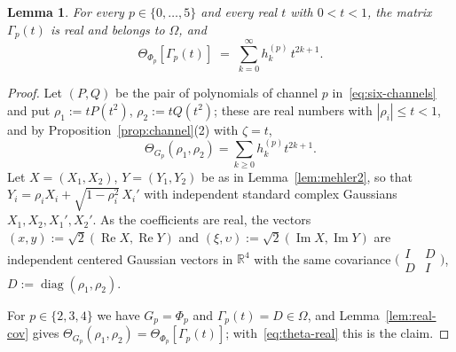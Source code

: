 \documentclass[11pt,reqno]{amsart}
\newtheorem{lemma}[theorem]{Lemma}
\theoremstyle{definition}
\numberwithin{equation}{section}
\newcommand{\R}{\mathbb{R}}
\newcommand{\Om}{\Omega}
\DeclareMathOperator{\RePart}{Re}
\DeclareMathOperator{\ImPart}{Im}
\DeclareMathOperator{\diag}{diag}
\begin{document}
\begin{lemma}\label{lem:six-corr}
For every $p\in\{0,\dots,5\}$ and every real $t$ with $0<t<1$, the matrix $\Gamma_p(t)$ is real and belongs to $\Om$, and
\[
  \Theta_{\Phi_p}[\Gamma_p(t)]\;=\;\sum_{k=0}^\infty h^{(p)}_k\,t^{2k+1}.
\]
\end{lemma}

\begin{proof}
Let $(P,Q)$ be the pair of polynomials of channel $p$ in~\eqref{eq:six-channels} and put $\rho_1:=tP(t^2)$, $\rho_2:=tQ(t^2)$; these are real numbers with $|\rho_i|\le t<1$, and by Proposition~\ref{prop:channel}(2) with $\zeta=t$,
\begin{equation}\label{eq:theta-real}
  \Theta_{G_p}(\rho_1,\rho_2)=\sum_{k\ge0}h^{(p)}_kt^{2k+1}.
\end{equation}
Let $X=(X_1,X_2)$, $Y=(Y_1,Y_2)$ be as in Lemma~\ref{lem:mehler2}, so that $Y_i=\rho_iX_i+\sqrt{1-\rho_i^2}\,X_i'$ with independent standard complex Gaussians $X_1,X_2,X_1',X_2'$. As the coefficients are real, the vectors $(x,y):=\sqrt2(\RePart X,\RePart Y)$ and $(\xi,\upsilon):=\sqrt2(\ImPart X,\ImPart Y)$ are independent centered Gaussian vectors in $\R^4$ with the same covariance $\bigl(\begin{smallmatrix}I&D\\ D&I\end{smallmatrix}\bigr)$, $D:=\diag(\rho_1,\rho_2)$.

For $p\in\{2,3,4\}$ we have $G_p=\Phi_p$ and $\Gamma_p(t)=D\in\Om$, and Lemma~\ref{lem:real-cov} gives $\Theta_{G_p}(\rho_1,\rho_2)=\Theta_{\Phi_p}[\Gamma_p(t)]$; with~\eqref{eq:theta-real} this is the claim.


\end{proof}
\end{document}
